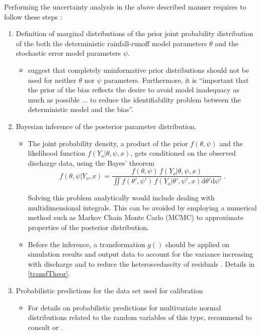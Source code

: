 \documentclass{ctuthesis}\usepackage[]{graphicx}\usepackage[]{color}
\begin{document}
Performing the uncertainty analysis in the above described manner requires to follow these steps \citep{giudice2013improving}:
\begin{enumerate}
	\item  Definition of marginal distributions of the prior joint probability distribution of the both the deterministic rainfall-runoff model parameters $\theta$  and  the stochastic error model parameters $\psi$.
        \begin{itemize}
                \item \cite{giudice2013improving} suggest that completely uninformative prior distributions should not be used for neither $\theta$ nor $\psi$ parameters. Furthermore, it is \enquote{important that the prior of the bias reflects the desire to avoid model inadequacy as much as possible ... to reduce the identifiability problem between the deterministic
model and the bias}.
        \end{itemize}

	\item  Bayesian inference of the posterior parameter distribution.
	\begin{itemize}
                \item	The joint probability density, a product of the prior $f(\theta, \psi)$ and the likelihood function $f(Y_o | \theta, \psi, x)$, gets conditioned on the observed discharge data, using the Bayes' theorem
                \begin{equation}
f (\theta, \psi | Y_o, x) = \frac{ f(\theta, \psi) \, f(Y_o | \theta, \psi, x) } { \iint f(\theta' , \psi') \, f(Y_o | \theta', \psi', x) \text{d}\theta' \text{d}\psi'} \; .
                \end{equation}

Solving this problem analytically would include dealing with multidimensional integrals. This can be avoided by employing a numerical method such as Markov Chain Monte Carlo (MCMC) to approximate properties of the posterior distribution.

        \item Before the inference, a transformation $g()$  should be applied on simulation results and output data to account for the variance increasing with discharge and to reduce the heteroscedascity of residuals \citep{giudice2013improving}. Details in \ref{transfTheor}.
        \end{itemize}
        
	\item  Probabilistic predictions for the data set used for calibration
	\begin{itemize}
                \item For details on probabilistic predictions for multivariate normal distributions related to the random variables of this type, \cite{giudice2013improving} recommend to consult \cite{kendall1994vol} or \cite{kollo2006advanced}.
        \end{itemize}
	

\end{enumerate}
\end{document}
